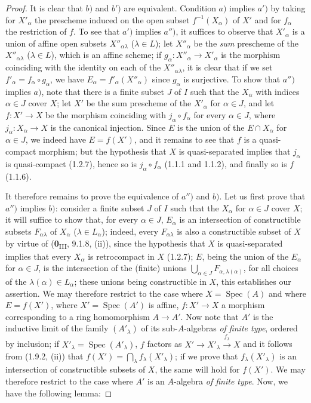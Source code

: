 \begin{proof}
It is clear that $b)$ and $b')$ are equivalent. Condition $a)$ implies
$a')$ by taking for $X'_\alpha$ the prescheme induced on the open subset
$f^{-1}(X_\alpha)$ of $X'$ and for $f_\alpha$ the restriction of $f$. To
see that $a')$ implies $a'')$, it suffices to observe that $X'_\alpha$ is a
union of affine open subsets $X''_{\alpha\lambda}$ ($\lambda\in L$); let
$X''_\alpha$ be the \emph{sum} prescheme of the $X''_{\alpha\lambda}$
($\lambda\in L$), which is an affine scheme; if
$g_\alpha:X''_\alpha\to X'_\alpha$ is the morphism coinciding with
the identity on each of the $X''_{\alpha\lambda}$, it is clear that if we
set $f'_\alpha=f_\alpha\circ g_\alpha$, we have
$E_\alpha=f'_\alpha(X''_\alpha)$ since $g_\alpha$ is surjective. To
show that $a'')$ implies $a)$, note that there is a finite subset $J$ of
$I$ such that the $X_\alpha$ with indices $\alpha\in J$ cover $X$; let
$X'$ be the sum prescheme of the $X'_\alpha$ for $\alpha\in J$, and let
$f:X'\to X$ be the morphism coinciding with $j_\alpha\circ f_\alpha$ for
every $\alpha\in J$, where $j_\alpha:X_\alpha\to X$ is the canonical
injection. Since $E$ is the union of the $E\cap X_\alpha$ for $\alpha\in J$,
we indeed have $E=f(X')$, and it remains to see that $f$ is a quasi-compact
morphism; but the hypothesis that $X$ is quasi-separated implies that
$j_\alpha$ is quasi-compact (1.2.7), hence so is
$j_\alpha\circ f_\alpha$ (1.1.1 and 1.1.2), and finally so is $f$ (1.1.6).

It therefore remains to prove the equivalence of $a'')$ and $b)$. Let us
first prove that $a'')$ implies $b)$: consider a finite subset $J$ of $I$
such that the $X_\alpha$ for $\alpha\in J$ cover $X$; it will suffice to
show that, for every $\alpha\in J$, $E_\alpha$ is an intersection of
constructible subsets $F_{\alpha\lambda}$ of $X_\alpha$ ($\lambda\in L_\alpha$);
indeed, every $F_{\alpha\lambda}$ is also a constructible subset of $X$
by virtue of (\textbf{0}\textsubscript{III}, 9.1.8, (ii)), since the hypothesis that
$X$ is quasi-separated implies that every $X_\alpha$ is retrocompact in $X$
(1.2.7); $E$, being the union of the $E_\alpha$ for $\alpha\in J$, is the
intersection of the (finite) unions
$\bigcup_{\alpha\in J}F_{\alpha,\lambda(\alpha)}$, for
all choices of the $\lambda(\alpha)\in L_\alpha$; these unions being
constructible in $X$, this establishes our assertion. We may therefore
restrict to the case
where $X=\operatorname{Spec}(A)$ and where $E=f(X')$, where
$X'=\operatorname{Spec}(A')$ is affine, $f:X'\to X$ a morphism
corresponding to a ring homomorphism $A\to A'$. Now note that
$A'$ is the inductive limit of the family $(A'_\lambda)$ of its
sub-$A$-algebras \emph{of finite type}, ordered by inclusion; if
$X'_\lambda=\operatorname{Spec}(A'_\lambda)$, $f$ factors as
$X'\to X'_\lambda\xrightarrow{f_\lambda}X$ and it follows from (1.9.2, (ii))
that $f(X')=\bigcap_\lambda f_\lambda(X'_\lambda)$; if we prove
that $f_\lambda(X'_\lambda)$ is an intersection of constructible subsets of
$X$, the same will hold for $f(X')$. We may therefore restrict to the case
where $A'$ is an $A$-algebra \emph{of finite type}. Now, we have the
following lemma:
\end{proof}

